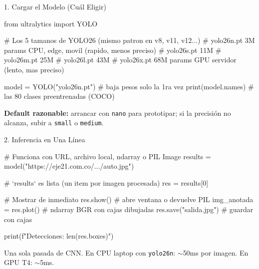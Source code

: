 \documentclass[aspectratio=169, 11pt]{beamer}
\begin{document}
\begin{frame}{1. Cargar el Modelo (Cu\'al Eligir)}
  \vspace{-4pt}
  \begin{pyblock}
from ultralytics import YOLO

# Los 5 tamanos de YOLO26 (mismo patron en v8, v11, v12...)
# yolo26n.pt   3M params   CPU, edge, movil    (rapido, menos preciso)
# yolo26s.pt  11M
# yolo26m.pt  25M
# yolo26l.pt  43M
# yolo26x.pt  68M params   GPU servidor        (lento, mas preciso)

model = YOLO("yolo26n.pt")    # baja pesos solo la 1ra vez
print(model.names)             # las 80 clases preentrenadas (COCO)
  \end{pyblock}

  \vspace{4pt}
  {\scriptsize\color{textMuted}
    \faLightbulb\hspace{4pt} \textbf{Default razonable:} arrancar con
    \texttt{nano} para prototipar; si la precisi\'on no alcanza, subir
    a \texttt{small} o \texttt{medium}.}
\end{frame}

\begin{frame}{2. Inferencia en Una L\'inea}
  \vspace{-4pt}
  \begin{pyblock}
# Funciona con URL, archivo local, ndarray o PIL Image
results = model("https://eje21.com.co/.../auto.jpg")

# `results` es lista (un item por imagen procesada)
res = results[0]

# Mostrar de inmediato
res.show()                    # abre ventana o devuelve PIL
img_anotada = res.plot()      # ndarray BGR con cajas dibujadas
res.save("salida.jpg")        # guardar con cajas

print(f"Detecciones: {len(res.boxes)}")
  \end{pyblock}

  \vspace{4pt}
  {\scriptsize\color{textMuted}
    \faLightbulb\hspace{4pt} Una sola pasada de CNN. En CPU laptop con
    \texttt{yolo26n}: $\sim$50ms por imagen. En GPU T4: $\sim$5ms.}
\end{frame}
\end{document}
